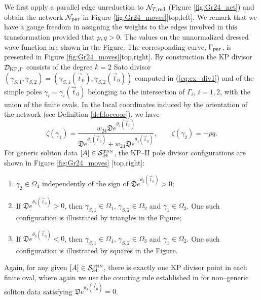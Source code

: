 \documentclass[11pt]{amsart}
\theoremstyle{plain}
\numberwithin{equation}{section}
\def \DKP {{\mathcal D}_{\textup{\scriptsize KP},\Gamma}}
\begin{document}
We first apply a parallel edge unreduction to ${\mathcal N}_{T,{\mbox{\scriptsize red}}}$ (Figure \ref{fig:Gr24_net}) and obtain the network  ${\mathcal N}_{{\mbox{\scriptsize par}}}$ in Figure \ref{fig:Gr24_moves}[top,left]. We remark that we have a gauge freedom in assigning the weights to the edges involved in this transformation provided that $p,q>0$. The values on the unnormalized dressed wave function are shown in the Figure. The corresponding curve,  ${\Gamma}_{\mbox{\scriptsize par}}$, is presented in Figure \ref{fig:Gr24_moves}[top,right]. By construction the KP divisor $\DKP$ consists of the degree $k=2$ Sato divisor $(\gamma_{S,1} ,\gamma_{S,2} )=(\gamma_{S,1} (\vec t_0),\gamma_{S,2} (\vec t_0))$ computed in (\ref{eq:ex_div1}) and of the simple poles $\gamma_{i}=\gamma_{i} (\vec t_0)$ belonging to the intersection of 
$\Gamma_{i}$, $i=1,2$, with the union of the finite ovals. In the local coordinates induced by the orientation of the network (see Definition \ref{def:loccoor}), we have
\begin{equation}\label{eq:ex_div2}
\zeta(\gamma_{1}) = \frac{w_{24} {\mathfrak D} e^{\theta_4(\vec t_0)}}{{\mathfrak D} e^{\theta_3(\vec t_0)}+ w_{24} 
{\mathfrak D} e^{\theta_4(\vec t_0)}}, \quad\quad   \zeta(\gamma_{2}) = -pq.
\end{equation}
For generic soliton data $[A]\in {\mathcal S}_{34}^{\mbox{\tiny TNN}}$, the KP--II pole divisor configurations are shown in Figure \ref{fig:Gr24_moves} [top,right]:
\begin{enumerate}
\item $\gamma_{2} \in \Omega_4$ independently of the sign of ${\mathfrak D} e^{\theta_3(\vec t_0)}>0$;
\item If ${\mathfrak D} e^{\theta_3(\vec t_0)}>0$, then $\gamma_{S,1} \in \Omega_1$, $\gamma_{S,2} \in \Omega_2$ and $\gamma_{1} \in \Omega_3$. One such configuration is illustrated by triangles in the Figure;
\item If ${\mathfrak D} e^{\theta_3(\vec t_0)}<0$, then $\gamma_{S,1} \in \Omega_1$, $\gamma_{S,2} \in \Omega_3$ and $\gamma_{1} \in \Omega_2$. One such configuration is illustrated by squares in the Figure.
\end{enumerate}
Again, for any given $[A]\in {\mathcal S}_{34}^{\mbox{\tiny TNN}}$, there is exactly one KP divisor point in each finite oval, where again we use the counting rule established in \cite{AG1} for non--generic soliton data satisfying ${\mathfrak D} e^{\theta_3(\vec t_0)}=0$.
\end{document}
